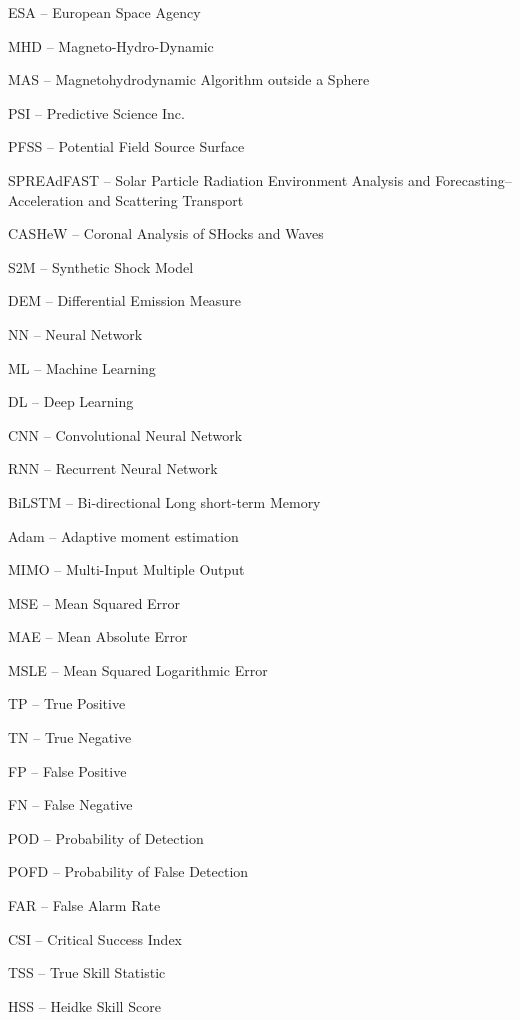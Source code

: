 ESA -- European Space Agency

MHD -- Magneto-Hydro-Dynamic

MAS -- Magnetohydrodynamic Algorithm outside a Sphere

PSI -- Predictive Science Inc.

PFSS -- Potential Field Source Surface

SPREAdFAST -- Solar Particle Radiation Environment Analysis and Forecasting–Acceleration and Scattering Transport

CASHeW -- Coronal Analysis of SHocks and Waves

S2M -- Synthetic Shock Model

DEM -- Differential Emission Measure

NN -- Neural Network

ML -- Machine Learning

DL -- Deep Learning

CNN -- Convolutional Neural Network

RNN -- Recurrent Neural Network

BiLSTM -- Bi-directional Long short-term Memory

Adam -- Adaptive moment estimation

MIMO -- Multi-Input Multiple Output

MSE -- Mean Squared Error

MAE -- Mean Absolute Error

MSLE -- Mean Squared Logarithmic Error

TP -- True Positive

TN -- True Negative

FP -- False Positive

FN -- False Negative

POD -- Probability of Detection

POFD -- Probability of False Detection

FAR -- False Alarm Rate

CSI -- Critical Success Index

TSS -- True Skill Statistic

HSS -- Heidke Skill Score